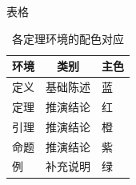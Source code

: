 
\begin{frame}{表格}
  \begin{table}
    \centering
    \caption{各定理环境的配色对应}
    \begin{tabular}{lcl}
      \hline
      环境 & 类别 & 主色 \\
      \hline
      定义 & 基础陈述 & \textcolor{mainblue}{蓝} \\
      定理 & 推演结论 & \textcolor{mainred}{红} \\
      引理 & 推演结论 & \textcolor{mainorange}{橙} \\
      命题 & 推演结论 & \textcolor{mainpurple}{紫} \\
      例 & 补充说明 & \textcolor{maingreen}{绿} \\
      \hline
    \end{tabular}
  \end{table}
\end{frame}
